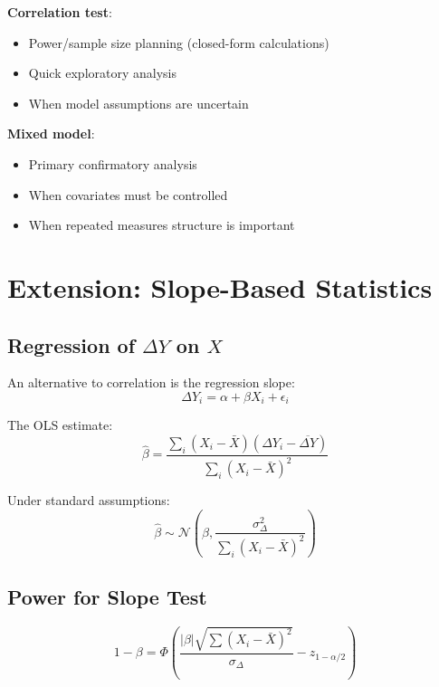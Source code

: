 \documentclass[11pt]{article}
\theoremstyle{definition}
\begin{document}
\textbf{Correlation test}:
\begin{itemize}
    \item Power/sample size planning (closed-form calculations)
    \item Quick exploratory analysis
    \item When model assumptions are uncertain
\end{itemize}

\textbf{Mixed model}:
\begin{itemize}
    \item Primary confirmatory analysis
    \item When covariates must be controlled
    \item When repeated measures structure is important
\end{itemize}

\section{Extension: Slope-Based Statistics}

\subsection{Regression of $\Delta Y$ on $X$}

An alternative to correlation is the regression slope:
\begin{equation}
\Delta Y_i = \alpha + \beta X_i + \epsilon_i
\end{equation}

The OLS estimate:
\begin{equation}
\hat{\beta} = \frac{\sum_{i}(X_i - \bar{X})(\Delta Y_i - \overline{\Delta Y})}
{\sum_{i}(X_i - \bar{X})^2}
\end{equation}

Under standard assumptions:
\begin{equation}
\hat{\beta} \sim \mathcal{N}\left(\beta, \frac{\sigma_{\Delta}^2}{\sum_{i}(X_i - \bar{X})^2}\right)
\end{equation}

\subsection{Power for Slope Test}

\begin{equation}
1 - \beta = \Phi\left(\frac{|\beta|\sqrt{\sum(X_i - \bar{X})^2}}{\sigma_{\Delta}}
- z_{1-\alpha/2}\right)
\end{equation}
\end{document}

